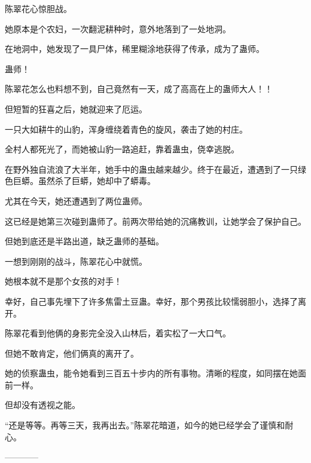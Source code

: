 \begin{this_body}
陈翠花心惊胆战。

她原本是个农妇，一次翻泥耕种时，意外地落到了一处地洞。

在地洞中，她发现了一具尸体，稀里糊涂地获得了传承，成为了蛊师。

蛊师！

陈翠花怎么也料想不到，自己竟然有一天，成了高高在上的蛊师大人！！

但短暂的狂喜之后，她就迎来了厄运。

一只大如耕牛的山豹，浑身缠绕着青色的旋风，袭击了她的村庄。

全村人都死光了，而她被山豹一路追赶，靠着蛊虫，侥幸逃脱。

在野外独自流浪了大半年，她手中的蛊虫越来越少。终于在最近，遭遇到了一只绿色巨蟒。虽然杀了巨蟒，她却中了蟒毒。

尤其在今天，她还遭遇到了两位蛊师。

这已经是她第三次碰到蛊师了。前两次带给她的沉痛教训，让她学会了保护自己。

但她到底还是半路出道，缺乏蛊师的基础。

一想到刚刚的战斗，陈翠花心中就慌。

她根本就不是那个女孩的对手！

幸好，自己事先埋下了许多焦雷土豆蛊。幸好，那个男孩比较懦弱胆小，选择了离开。

陈翠花看到他俩的身影完全没入山林后，着实松了一大口气。

但她不敢肯定，他们俩真的离开了。

她的侦察蛊虫，能令她看到三百五十步内的所有事物。清晰的程度，如同摆在她面前一样。

但却没有透视之能。

“还是等等。再等三天，我再出去。”陈翠花暗道，如今的她已经学会了谨慎和耐心。

------------

\end{this_body}

